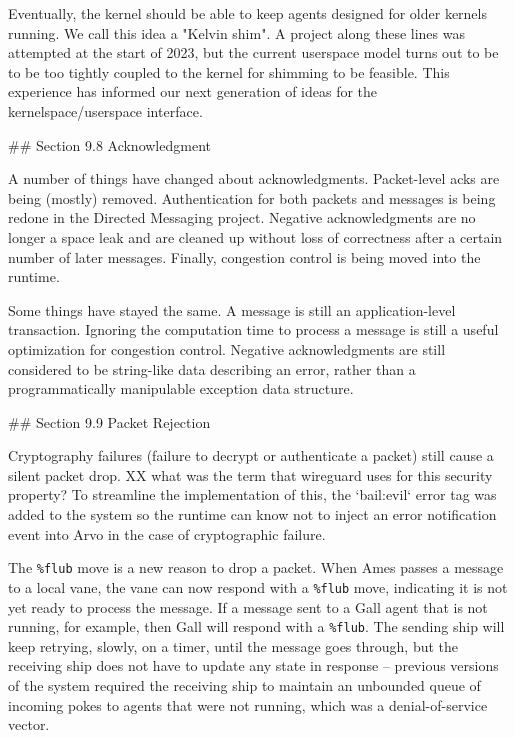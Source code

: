 \documentclass[twoside]{article}
\begin{document}
Eventually, the kernel should be able to keep agents designed for older kernels running.  We call this idea a "Kelvin shim".  A project along these lines was attempted at the start of 2023, but the current userspace model turns out to be to be too tightly coupled to the kernel for shimming to be feasible.  This experience has informed our next generation of ideas for the kernelspace/userspace interface.

## Section 9.8 Acknowledgment

A number of things have changed about acknowledgments.  Packet-level acks are being (mostly) removed.  Authentication for both packets and messages is being redone in the Directed Messaging project.  Negative acknowledgments are no longer a space leak and are cleaned up without loss of correctness after a certain number of later messages.  Finally, congestion control is being moved into the runtime.

Some things have stayed the same.  A message is still an application-level transaction.  Ignoring the computation time to process a message is still a useful optimization for congestion control.  Negative acknowledgments are still considered to be string-like data describing an error, rather than a programmatically manipulable exception data structure.

## Section 9.9 Packet Rejection

Cryptography failures (failure to decrypt or authenticate a packet) still cause a silent packet drop.  XX what was the term that wireguard uses for this security property?  To streamline the implementation of this, the `bail:evil` error tag was added to the system so the runtime can know not to inject an error notification event into Arvo in the case of cryptographic failure.

The \lstinline[style=inlinecode]{%flub} move is a new reason to drop a packet.  When Ames passes a message to a local vane, the vane can now respond with a \lstinline[style=inlinecode]{%flub} move, indicating it is not yet ready to process the message.  If a message sent to a Gall agent that is not running, for example, then Gall will respond with a \lstinline[style=inlinecode]{%flub}.  The sending ship will keep retrying, slowly, on a timer, until the message goes through, but the receiving ship does not have to update any state in response – previous versions of the system required the receiving ship to maintain an unbounded queue of incoming pokes to agents that were not running, which was a denial-of-service vector.
\end{document}

